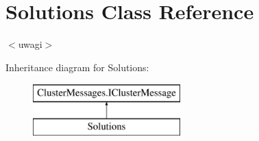 \hypertarget{class_solutions}{}\section{Solutions Class Reference}
\label{class_solutions}


$<$uwagi$>$  


Inheritance diagram for Solutions\+:\begin{figure}[H]
\begin{center}
\leavevmode
\includegraphics[height=2.000000cm]{class_solutions}
\end{center}
\end{figure}
